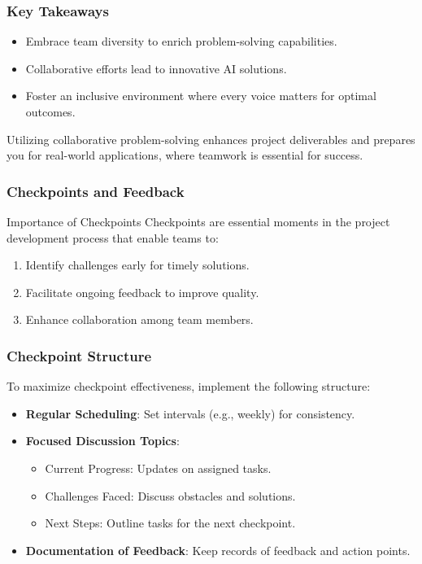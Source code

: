 \documentclass{beamer}
\begin{document}
\begin{frame}[fragile]
    \frametitle{Key Takeaways}
    \begin{itemize}
        \item Embrace team diversity to enrich problem-solving capabilities.
        \item Collaborative efforts lead to innovative AI solutions.
        \item Foster an inclusive environment where every voice matters for optimal outcomes.
    \end{itemize}
    Utilizing collaborative problem-solving enhances project deliverables and prepares you for real-world applications, where teamwork is essential for success.
\end{frame}

\begin{frame}[fragile]
    \frametitle{Checkpoints and Feedback}
    \begin{block}{Importance of Checkpoints}
        Checkpoints are essential moments in the project development process that enable teams to:
        \begin{enumerate}
            \item Identify challenges early for timely solutions.
            \item Facilitate ongoing feedback to improve quality.
            \item Enhance collaboration among team members.
        \end{enumerate}
    \end{block}
\end{frame}

\begin{frame}[fragile]
    \frametitle{Checkpoint Structure}
    To maximize checkpoint effectiveness, implement the following structure:
    \begin{itemize}
        \item \textbf{Regular Scheduling}: Set intervals (e.g., weekly) for consistency.
        \item \textbf{Focused Discussion Topics}:
        \begin{itemize}
            \item Current Progress: Updates on assigned tasks.
            \item Challenges Faced: Discuss obstacles and solutions.
            \item Next Steps: Outline tasks for the next checkpoint.
        \end{itemize}
        \item \textbf{Documentation of Feedback}: Keep records of feedback and action points.
    \end{itemize}
\end{frame}
\end{document}
